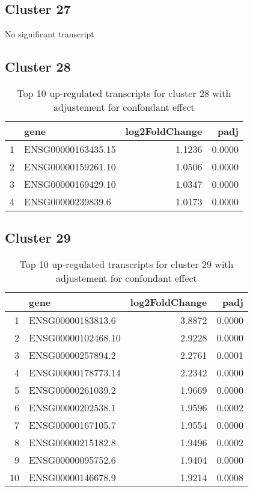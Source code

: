 \documentclass{article}
\begin{document}
\subsection{Cluster 27 }
No significant transcript
\subsection{Cluster 28 }
\begin{table}[H]
\centering
\begin{tabular}{rlrr}
  \hline
 & gene & log2FoldChange & padj \\ 
  \hline
1 & ENSG00000163435.15 & 1.1236 & 0.0000 \\ 
  2 & ENSG00000159261.10 & 1.0506 & 0.0000 \\ 
  3 & ENSG00000169429.10 & 1.0347 & 0.0000 \\ 
  4 & ENSG00000239839.6 & 1.0173 & 0.0000 \\ 
   \hline
\end{tabular}
\caption{Top 10 up-regulated transcripts for cluster 28 with adjustement for confondant effect} 
\label{tab:q3_1_conf_28}
\end{table}
\subsection{Cluster 29 }
\begin{table}[H]
\centering
\begin{tabular}{rlrr}
  \hline
 & gene & log2FoldChange & padj \\ 
  \hline
1 & ENSG00000183813.6 & 3.8872 & 0.0000 \\ 
  2 & ENSG00000102468.10 & 2.9228 & 0.0000 \\ 
  3 & ENSG00000257894.2 & 2.2761 & 0.0001 \\ 
  4 & ENSG00000178773.14 & 2.2342 & 0.0000 \\ 
  5 & ENSG00000261039.2 & 1.9669 & 0.0000 \\ 
  6 & ENSG00000202538.1 & 1.9596 & 0.0002 \\ 
  7 & ENSG00000167105.7 & 1.9554 & 0.0000 \\ 
  8 & ENSG00000215182.8 & 1.9496 & 0.0002 \\ 
  9 & ENSG00000095752.6 & 1.9404 & 0.0000 \\ 
  10 & ENSG00000146678.9 & 1.9214 & 0.0008 \\ 
   \hline
\end{tabular}
\caption{Top 10 up-regulated transcripts for cluster 29 with adjustement for confondant effect} 
\label{tab:q3_1_conf_29}
\end{table}
\end{document}
